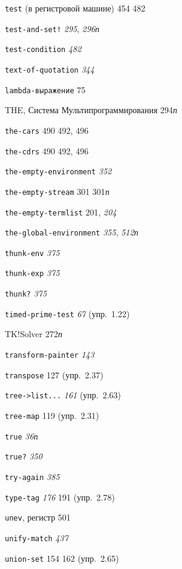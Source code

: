 \begin{theindex}
\item {\texttt{test} (в регистровой машине)} 454
   482
\item {\texttt{test-and-set!}} {\it 295}, {\it 296}{\it п}
\item {\texttt{test-condition}} {\it 482}
\item {\texttt{text-of-quotation}} {\it 344}
\item {\texttt{\texttt{lambda}-выражение}}
   75
\item {THE, Система Мультипрограммирования} 294{\it п}
\item {\texttt{the-cars}}
   490
   492, 496
\item {\texttt{the-cdrs}}
   490
   492, 496
\item {\texttt{the-empty-environment}} {\it 352}
\item {\texttt{the-empty-stream}} 301
   301{\it п}
\item {\texttt{the-empty-termlist}} 201, {\it 204}
\item {\texttt{the-global-environment}} {\it 355}, {\it 512}{\it п}
\item {\texttt{thunk-env}} {\it 375}
\item {\texttt{thunk-exp}} {\it 375}
\item {\texttt{thunk?}} {\it 375}
\item {\texttt{timed-prime-test}} {\it 67} (упр.~1.22)
\item {TK!Solver} 272{\it п}
\item {\texttt{transform-painter}} {\it 143}
\item {\texttt{transpose}} 127 (упр.~2.37)
\item {\texttt{tree->list...}} {\it 161} (упр.~2.63)
\item {\texttt{tree-map}} 119 (упр.~2.31)
\item {\texttt{true}} {\it 36}{\it п}
\item {\texttt{true?}} {\it 350}
\item {\texttt{try-again}} {\it 385}
\item {\texttt{type-tag}} {\it 176}
   191 (упр.~2.78)
\bigskip
\item {\texttt{unev}, регистр} 501
\item {\texttt{unify-match}} {\it 437}
\item {\texttt{union-set}} 154
   162 (упр.~2.65)

\end{theindex}
